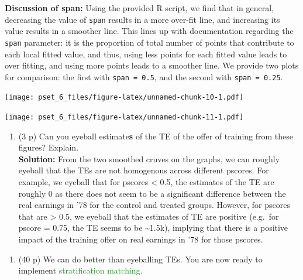 \documentclass[
]{article}
\providecommand{\tightlist}{%
  \setlength{\itemsep}{0pt}\setlength{\parskip}{0pt}}
\begin{document}
\textbf{Discussion of span:} Using the provided R script, we find that
in general, decreasing the value of \texttt{span} results in a more
over-fit line, and increasing its value results in a smoother line. This
lines up with documentation regarding the \texttt{span} parameter: it is
the proportion of total number of points that contribute to each local
fitted value, and thus, using less points for each fitted value leads to
over fitting, and using more points leads to a smoother line. We provide
two plots for comparison: the first with \texttt{span\ =\ 0.5}, and the
second with \texttt{span\ =\ 0.25}.

\texttt{[image: pset\_6\_files/figure-latex/unnamed-chunk-10-1.pdf]}

\texttt{[image: pset\_6\_files/figure-latex/unnamed-chunk-11-1.pdf]}

\begin{enumerate}
\def\labelenumi{\alph{enumi}.}
\setcounter{enumi}{1}
\tightlist
\item
  (3 p) Can you eyeball estimate\textbf{s} of the TE of the offer of
  training from these figures? Explain.\\
  \textbf{Solution:} From the two smoothed cruves on the graphs, we can
  roughly eyeball that the TEs are not homogenous across different
  pscores. For example, we eyeball that for pscores \textless{} 0.5, the
  estimates of the TE are roughly 0 as there does not seem to be a
  significant difference between the real earnings in '78 for the
  control and treated groups. However, for pscores that are
  \textgreater{} 0.5, we eyeball that the estimates of TE are positive
  (e.g.~for pscore = 0.75, the TE seems to be \textasciitilde1.5k),
  implying that there is a positive impact of the training offer on real
  earnings in '78 for those pscores.
\end{enumerate}

\begin{enumerate}
\def\labelenumi{\arabic{enumi}.}
\setcounter{enumi}{2}
\tightlist
\item
  (40 p) We can do better than eyeballing TEs. You are now ready to
  implement \textcolor{ForestGreen}{stratification matching}.
\end{enumerate}
\end{document}
